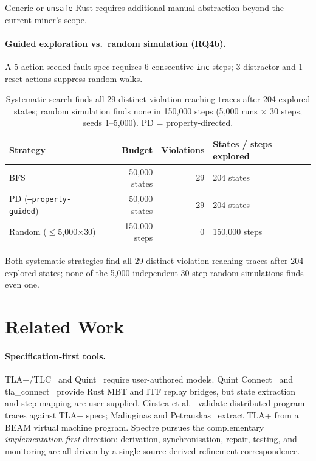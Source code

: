 \documentclass[runningheads]{../paper-vmcai-2027/llncs}
\begin{document}
Generic or \texttt{unsafe} Rust requires additional manual abstraction beyond
the current miner's scope.

\paragraph{Guided exploration vs.\ random simulation (RQ4b).}
A 5-action seeded-fault spec requires 6 consecutive \texttt{inc} steps;
3 distractor and 1 reset actions suppress random walks.

\begin{table}[t]
\caption{Systematic search finds all 29 distinct violation-reaching traces after
  204 explored states; random simulation finds none in 150{,}000 steps
  (5{,}000 runs $\times$ 30 steps, seeds 1--5{,}000). PD = property-directed.}\label{tab:testing}
\centering\scriptsize
\begin{tabular}{lrrl}
\toprule
Strategy & Budget & Violations & States / steps explored \\
\midrule
BFS              & 50{,}000 states & 29 & 204 states \\
PD (\texttt{--property-guided}) & 50{,}000 states & 29 & 204 states \\
Random ($\le$5{,}000$\times$30) & 150{,}000 steps & 0  & 150{,}000 steps \\
\bottomrule
\end{tabular}
\end{table}

Both systematic strategies find all 29 distinct violation-reaching traces after
204 explored states; none of the 5{,}000 independent 30-step random simulations
finds even one.

\section{Related Work}\label{sec:related}

\paragraph{Specification-first tools.}
TLA+/TLC~\cite{16_lamport2002specifying,15_kuppe2019toolbox} and Quint~\cite{12_informal2023quint}
require user-authored models.
Quint Connect~\cite{13_informal2024quintconnect} and tla\_connect~\cite{2_tlaconnect2024} provide
Rust MBT and ITF replay bridges, but state extraction and step mapping are
user-supplied.
C\^{i}rstea et al.~\cite{4_cirstea2024validating} validate distributed program traces
against TLA+ specs; Maliuginas and Petrauskas~\cite{19_maliuginas2024extracting}
extract TLA+ from a BEAM virtual machine program.
Spectre pursues the complementary \emph{implementation-first} direction:
derivation, synchronisation, repair, testing, and monitoring are all driven
by a single source-derived refinement correspondence.
\end{document}
